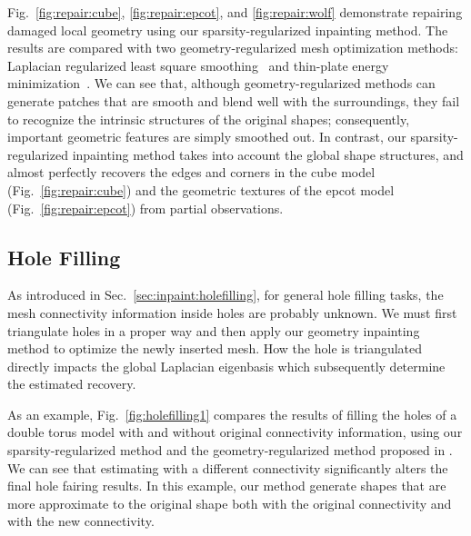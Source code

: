 Fig.~\ref{fig:repair:cube}, \ref{fig:repair:epcot}, and \ref{fig:repair:wolf}
demonstrate repairing damaged local geometry using our sparsity-regularized
inpainting method. The results are compared with two geometry-regularized mesh
optimization methods: Laplacian regularized least square
smoothing~\cite{Nealen2006} and thin-plate energy minimization~\cite{Bac2008}.
We can see that, although geometry-regularized methods can generate patches
that are smooth and blend well with the surroundings, they fail to recognize
the intrinsic structures of the original shapes; consequently, important
geometric features are simply smoothed out. In contrast, our
sparsity-regularized inpainting method takes into account the global shape
structures, and almost perfectly recovers the edges and corners in the cube
model (Fig.~\ref{fig:repair:cube}) and the geometric textures of the epcot
model (Fig.~\ref{fig:repair:epcot}) from partial observations.


\subsection{Hole Filling}

As introduced in Sec.~\ref{sec:inpaint:holefilling}, for general hole filling
tasks, the mesh connectivity information inside holes are probably unknown. We
must first triangulate holes in a proper way and then apply our geometry
inpainting method to optimize the newly inserted mesh. How the hole is
triangulated directly impacts the global Laplacian eigenbasis which subsequently
determine the estimated recovery.

As an example, Fig.~\ref{fig:holefilling1} compares the results of filling the
holes of a double torus model with and without original connectivity
information, using our sparsity-regularized method and the geometry-regularized
method proposed in \cite{Bac2008}. We can see that estimating with a different
connectivity significantly alters the final hole fairing results. In this
example, our method generate shapes that are more approximate to the original
shape both with the original connectivity and with the new connectivity.

